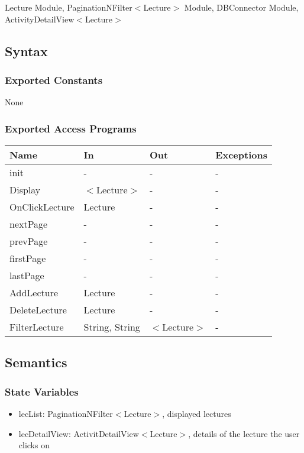 \documentclass[12pt, titlepage]{article}
\begin{document}
Lecture Module, PaginationNFilter$<$Lecture$>$ Module, DBConnector Module,\\ ActivityDetailView$<$Lecture$>$

\subsection{Syntax}

\subsubsection{Exported Constants}
None

\subsubsection{Exported Access Programs}
\begin{center}
\begin{tabular}{p{4cm} p{2cm} p{4cm} p{4cm}}
\hline
\textbf{Name} & \textbf{In} & \textbf{Out} & \textbf{Exceptions} \\
\hline
init & - & - & -\\
Display & $<$Lecture$>$ & - & - \\
OnClickLecture & Lecture & - & -\\ 
nextPage & - & - &  -\\
prevPage & - & - &  -\\
firstPage & - & - &  -\\
lastPage & - & - &  -\\
AddLecture & Lecture & - & - \\
DeleteLecture & Lecture & - & - \\
FilterLecture & String, String & $<$Lecture$>$ & - \\
\hline
\end{tabular}
\end{center}

\subsection{Semantics}

\subsubsection{State Variables}

\begin{itemize}
\item lecList: PaginationNFilter$<$Lecture$>$, displayed lectures
\item lecDetailView: ActivitDetailView$<$Lecture$>$, details of the lecture the user clicks on
\end{itemize}
\end{document}
